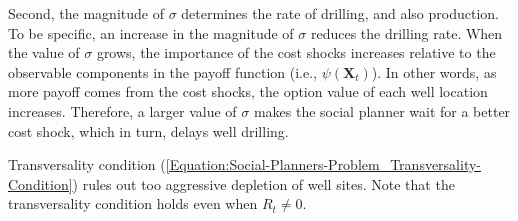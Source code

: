 Second, the magnitude of $\sigma$ determines the rate of drilling, and also production. To be specific, an increase in the magnitude of $\sigma$ reduces the drilling rate. When the value of $\sigma$ grows, the importance of the cost shocks increases relative to the observable components in the payoff function (i.e., $\psi(\boldsymbol{X}_{t})$). In other words, as more payoff comes from the cost shocks, the option value of each well location increases. Therefore, a larger value of $\sigma$ makes the social planner wait for a better cost shock, which in turn, delays well drilling. 

Transversality condition (\ref{Equation:Social-Planners-Problem_Transversality-Condition}) rules out too aggressive depletion of well sites. Note that the transversality condition holds even when $R_{t} \neq 0$.
